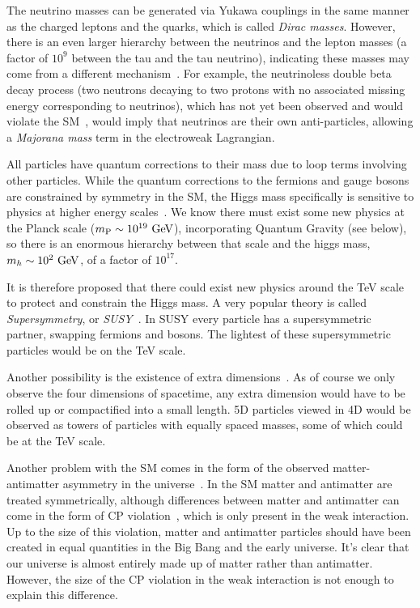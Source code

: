 The neutrino masses can be generated via Yukawa couplings in the same manner as the charged leptons and the quarks, which is called \textit{Dirac masses}.
However, there is an even larger hierarchy between the neutrinos and the lepton masses (a factor of $10^9$ between the tau and the tau neutrino), indicating these masses may come from a different mechanism~\cite{King:2003jb}.
For example, the neutrinoless double beta decay process (two neutrons decaying to two protons with no associated missing energy corresponding to neutrinos), which has not yet been observed and would violate the SM~\cite{Schwingenheuer:2012zs}, would imply that neutrinos are their own anti-particles, allowing a \textit{Majorana mass} term in the electroweak Lagrangian.

All particles have quantum corrections to their mass due to loop terms involving other particles.
While the quantum corrections to the fermions and gauge bosons are constrained by symmetry in the SM, the Higgs mass specifically is sensitive to physics at higher energy scales~\cite{Csaki:2016kln,deGouvea:2014xba,Nilles:1982dy}.
We know there must exist some new physics at the Planck scale ($m_\text{P}\sim10^{19}~\mathrm{GeV}$), incorporating Quantum Gravity (see below), so there is an enormous hierarchy between that scale and the higgs mass, $m_h\sim 10^2~\mathrm{GeV}$, of a factor of $10^{17}$.

It is therefore proposed that there could exist new physics around the TeV scale to protect and constrain the Higgs mass.
A very popular theory is called \textit{Supersymmetry}, or \textit{SUSY}~\cite{wess_bagger_2009,Wess:1984jr,Lykken:1996xt,Quevedo:2010ui,Strassler:2003qg,Peskin:1997qi,Seiberg:1994pq,Intriligator:2007cp,Dobrescu:2000yn,Ellwanger:2003jt,Dermisek:2005ar,Chang:2008cw,Morrissey:2008gm}.
In SUSY every particle has a supersymmetric partner, swapping fermions and bosons.
The lightest of these supersymmetric particles would be on the TeV scale.

Another possibility is the existence of extra dimensions~\cite{Kaluza:1921tu,Klein:1926tv,Einstein:1938fk,Csaki:2004ay,Csaki:2005vy,Rattazzi:2003ea,Ponton:2012bi,Cheng:2010pt}.
As of course we only observe the four dimensions of spacetime, any extra dimension would have to be rolled up or compactified into a small length.
5D particles viewed in 4D would be observed as towers of particles with equally spaced masses, some of which could be at the TeV scale.

Another problem with the SM comes in the form of the observed matter-antimatter asymmetry in the universe~\cite{Canetti:2012zc}.
In the SM matter and antimatter are treated symmetrically, although differences between matter and antimatter can come in the form of CP violation~\cite{Sakharov:1967dj}, which is only present in the weak interaction.
Up to the size of this violation, matter and antimatter particles should have been created in equal quantities in the Big Bang and the early universe.
It's clear that our universe is almost entirely made up of matter rather than antimatter.
However, the size of the CP violation in the weak interaction is not enough to explain this difference.

